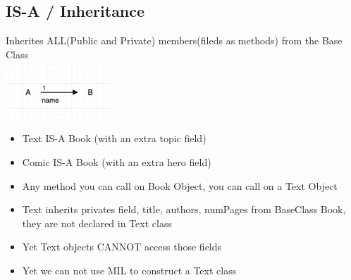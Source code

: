 \documentclass{report}
\begin{document}
\subsection{IS-A / Inheritance}
Inherites ALL(Public and Private) members(fileds as methods) from the Base Class\\
\includegraphics[width = 0.3\textwidth]{cs3}\\
\begin{itemize}
\item Text IS-A Book (with an extra topic field)
\item Comic IS-A Book (with an extra hero field)
\item Any method you can call on Book Object, you can call on a Text Object
\item Text inherits privates field, title, authors, numPages from BaseClass Book, they are not declared in Text class
\item Yet Text objects CANNOT access those fields
\item Yet we can not use MIL to construct a Text class
\end{itemize}
\end{document}
